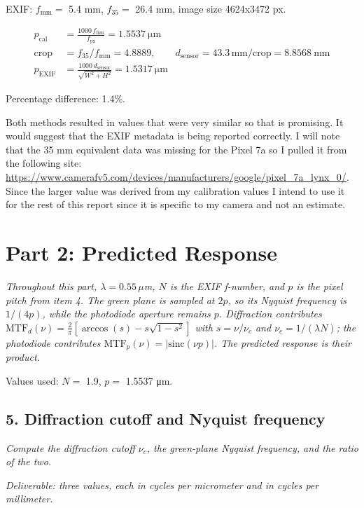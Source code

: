 \documentclass[11pt]{article}
\newcommand{\task}[3]{\subsection*{#1}{\sloppy\noindent\textit{#2}\par}\smallskip\noindent\textit{Deliverable: #3}\par\medskip}
\begin{document}
\noindent EXIF: $f_{\text{mm}} = $ 5.4 mm, \quad $f_{35} = $ 26.4 mm, \quad image size 4624x3472 px.

\begin{align*}
p_{\text{cal}} &= \frac{1000\, f_{\text{mm}}}{f_{\text{px}}} = \text{1.5537}\ \si{\micro\meter} \\
\text{crop} &= f_{35}/f_{\text{mm}} = \text{4.8889}, \qquad
d_{\text{sensor}} = 43.3\,\text{mm}/\text{crop} = \text{8.8568}\ \text{mm} \\
p_{\text{EXIF}} &= \frac{1000\, d_{\text{sensor}}}{\sqrt{W^2 + H^2}} = \text{1.5317}\ \si{\micro\meter}
\end{align*}

\noindent Percentage difference: 1.4\%.

Both methods resulted in values that were very similar so that is promising.
It would suggest that the EXIF metadata is being reported correctly.
I will note that the 35 mm equivalent data was missing for the Pixel 7a so I pulled it from the following site: \url{https://www.camerafv5.com/devices/manufacturers/google/pixel_7a_lynx_0/}.
Since the larger value was derived from my calibration values I intend to use it for the rest of this report since it is specific to my camera and not an estimate.

\section*{Part 2: Predicted Response}

\noindent\textit{Throughout this part, $\lambda = 0.55\,\mu$m, $N$ is the EXIF f-number, and $p$ is the pixel pitch from item 4. The green plane is sampled at $2p$, so its Nyquist frequency is $1/(4p)$, while the photodiode aperture remains $p$. Diffraction contributes $\mathrm{MTF}_d(\nu) = \tfrac{2}{\pi}\left[\arccos(s) - s\sqrt{1-s^2}\right]$ with $s = \nu/\nu_c$ and $\nu_c = 1/(\lambda N)$; the photodiode contributes $\mathrm{MTF}_p(\nu) = |\mathrm{sinc}(\nu p)|$. The predicted response is their product.}\par\medskip

\noindent Values used: $N = $ 1.9, \quad $p = $ 1.5537 \si{\micro\meter}.

\task{5. Diffraction cutoff and Nyquist frequency}
{Compute the diffraction cutoff $\nu_c$, the green-plane Nyquist frequency, and the ratio of the two.}
{three values, each in cycles per micrometer and in cycles per millimeter.}
\end{document}
